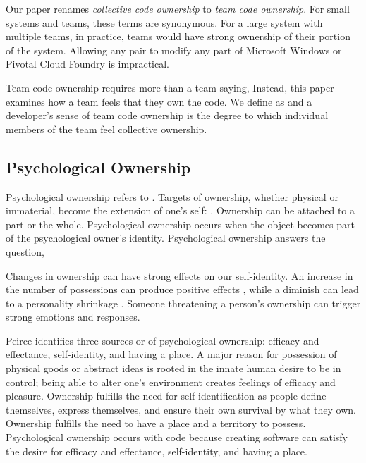 Our paper renames \textit{collective code ownership} to \textit{team code ownership}. For small systems and teams, these terms are synonymous. For a large system with multiple teams, in practice, teams would have strong ownership of their portion of the system. Allowing any pair to modify any part of Microsoft Windows or Pivotal Cloud Foundry is impractical.

Team code ownership requires more than a team saying,  Instead, this paper examines how a team feels that they own the code. We define  as  and a developer’s sense of team code ownership is the degree to which individual members of the team feel collective ownership.  

\subsection{Psychological Ownership}
Psychological ownership refers to  \cite{Pierce2001}. Targets of ownership, whether physical or immaterial, become the extension of one’s self:  \cite{Isaacs1933}. Ownership can be attached to a part or the whole. Psychological ownership occurs when the object becomes part of the psychological owner’s identity. Psychological ownership answers the question, 

Changes in ownership can have strong effects on our self-identity. An increase in the number of possessions can produce positive effects \cite{Formanek1994}, while a diminish can lead to a personality shrinkage \cite{James1890}. Someone threatening a person’s ownership can trigger strong emotions and responses.

Peirce \cite{Pierce2001} identifies three sources or  of psychological ownership: efficacy and effectance, self-identity, and having a place. A major reason for possession of physical goods or abstract ideas is rooted in the innate human desire to be in control; being able to alter one’s environment creates feelings of efficacy and pleasure. Ownership fulfills the need for self-identification as people define themselves, express themselves, and ensure their own survival by what they own. Ownership fulfills the need to have a place and a territory to possess.  Psychological ownership occurs with code because creating software can satisfy the desire for efficacy and effectance, self-identity, and having a place.

